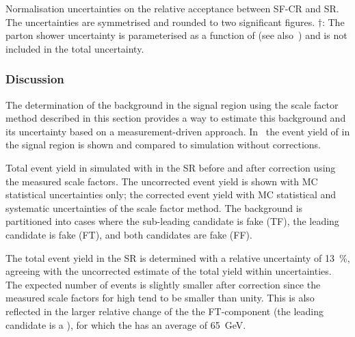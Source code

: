 \begin{table}[htbp]
  \centering

  \caption{Normalisation uncertainties on the relative acceptance
    between SF-CR and SR. The uncertainties are symmetrised and
    rounded to two significant figures. $\dagger$: The parton shower
    uncertainty is parameterised as a function of \tauhadvis \pT (see
    also~) and is not included in the
    total uncertainty.}%
  \label{tab:ttbarSF_acceptance_uncertainty}

  
\end{table}


\subsubsection{Discussion}

The determination of the \ttbarFakes background in the \hadhad signal
region using the scale factor method described in this section
provides a way to estimate this background and its uncertainty based
on a measurement-driven approach. In~ the
event yield of \ttbarFakes in the \hadhad signal region is shown and
compared to \ttbar simulation without corrections.

\begin{table}[htbp]
  \centering

  \caption{Total event yield in simulated \ttbar with \faketauhadvis
    in the \hadhad SR before and after correction using the measured
    scale factors. The uncorrected event yield is shown with MC
    statistical uncertainties only; the corrected event yield with MC
    statistical and systematic uncertainties of the scale factor
    method. The \ttbarFakes background is partitioned into cases where
    the \pT sub-leading \tauhadvis candidate is fake (TF), the leading
    candidate is fake (FT), and both candidates are fake (FF).}%
  \label{tab:ttbarSF_yields}

  
\end{table}

The total \ttbarFakes event yield in the \hadhad SR is determined with
a relative uncertainty of \SI{13}{\percent}, agreeing with the
uncorrected estimate of the total yield within uncertainties. The
expected number of \ttbarFakes events is slightly smaller after
correction since the measured scale factors for high \pT
\faketauhadvis tend to be smaller than unity. This is also reflected
in the larger relative change of the the FT-component (the leading
\tauhadvis candidate is a \faketauhadvis), for which the
\faketauhadvis has an average \pT of \SI{65}{\GeV}.

